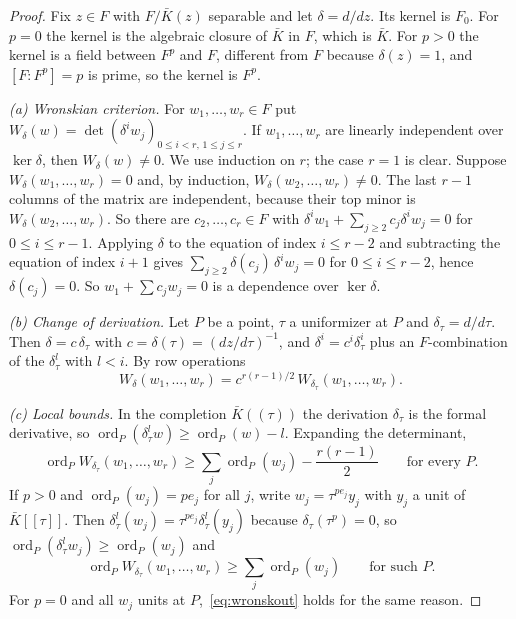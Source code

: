 \documentclass[11pt]{article}
\theoremstyle{definition}\newtheorem{definition}[theorem]{Definition}
\theoremstyle{remark}\newtheorem{remark}[theorem]{Remark}
\begin{document}
\begin{proof}
Fix $z\in F$ with $F/\bar K(z)$ separable and let $\delta=d/dz$. Its
kernel is $F_0$. For $p=0$ the kernel is the algebraic closure of $\bar K$
in $F$, which is $\bar K$. For $p>0$ the kernel is a field between $F^p$
and $F$, different from $F$ because $\delta(z)=1$, and $[F:F^p]=p$ is
prime, so the kernel is $F^p$.

\emph{(a) Wronskian criterion.} For $w_1,\ldots,w_r\in F$ put
$W_\delta(w)=\det(\delta^iw_j)_{0\le i<r,\,1\le j\le r}$. If
$w_1,\ldots,w_r$ are linearly independent over $\ker\delta$, then
$W_\delta(w)\ne0$. We use induction on $r$; the case $r=1$ is clear.
Suppose $W_\delta(w_1,\ldots,w_r)=0$ and, by induction,
$W_\delta(w_2,\ldots,w_r)\ne0$. The last $r-1$ columns of the matrix are
independent, because their top minor is $W_\delta(w_2,\ldots,w_r)$. So
there are $c_2,\ldots,c_r\in F$ with
$\delta^iw_1+\sum_{j\ge2}c_j\delta^iw_j=0$ for $0\le i\le r-1$. Applying
$\delta$ to the equation of index $i\le r-2$ and subtracting the equation
of index $i+1$ gives $\sum_{j\ge2}\delta(c_j)\,\delta^iw_j=0$ for
$0\le i\le r-2$, hence $\delta(c_j)=0$. So $w_1+\sum c_jw_j=0$ is a
dependence over $\ker\delta$.

\emph{(b) Change of derivation.} Let $P$ be a point, $\tau$ a uniformizer
at $P$ and $\delta_\tau=d/d\tau$. Then $\delta=c\,\delta_\tau$ with
$c=\delta(\tau)=(dz/d\tau)^{-1}$, and $\delta^i=c^i\delta_\tau^i$ plus an
$F$-combination of the $\delta_\tau^l$ with $l<i$. By row operations
\[
 W_\delta(w_1,\ldots,w_r)=c^{r(r-1)/2}\,W_{\delta_\tau}(w_1,\ldots,w_r).
\]

\emph{(c) Local bounds.} In the completion $\bar K((\tau))$ the
derivation $\delta_\tau$ is the formal derivative, so
$\operatorname{ord}_P(\delta_\tau^lw)\ge\operatorname{ord}_P(w)-l$.
Expanding the determinant,
\begin{equation}\label{eq:wronskS}
 \operatorname{ord}_PW_{\delta_\tau}(w_1,\ldots,w_r)
 \ge\sum_j\operatorname{ord}_P(w_j)-\frac{r(r-1)}2
 \qquad\text{for every }P.
\end{equation}
If $p>0$ and $\operatorname{ord}_P(w_j)=pe_j$ for all $j$, write
$w_j=\tau^{pe_j}y_j$ with $y_j$ a unit of $\bar K[[\tau]]$. Then
$\delta_\tau^l(w_j)=\tau^{pe_j}\delta_\tau^l(y_j)$ because
$\delta_\tau(\tau^p)=0$, so
$\operatorname{ord}_P(\delta_\tau^lw_j)\ge\operatorname{ord}_P(w_j)$ and
\begin{equation}\label{eq:wronskout}
 \operatorname{ord}_PW_{\delta_\tau}(w_1,\ldots,w_r)
 \ge\sum_j\operatorname{ord}_P(w_j)
 \qquad\text{for such }P.
\end{equation}
For $p=0$ and all $w_j$ units at $P$,~\eqref{eq:wronskout} holds for the
same reason.


\end{proof}
\end{document}
